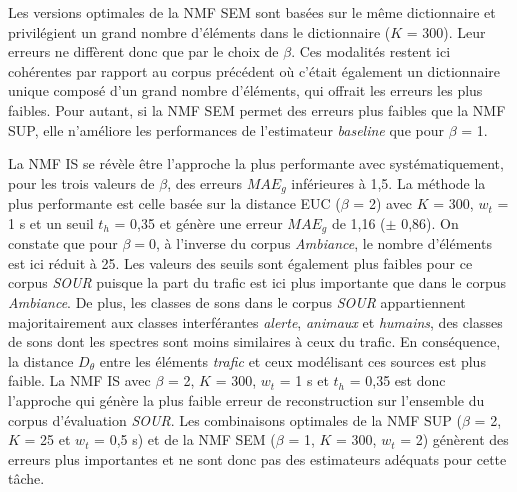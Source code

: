 Les versions optimales de la NMF SEM sont basées sur le même dictionnaire et privilégient un grand nombre d'éléments dans le dictionnaire ($K$ = 300). Leur erreurs ne diffèrent donc que par le choix de $\beta$. Ces modalités restent ici cohérentes par rapport au corpus précédent où c'était également un dictionnaire unique composé d'un grand nombre d'éléments, qui offrait les erreurs les plus faibles. Pour autant, si la NMF SEM permet des erreurs plus faibles que la NMF SUP, elle n'améliore les performances de l'estimateur \textit{baseline} que pour $\beta$ = 1.  

La NMF IS se révèle être l'approche la plus performante avec systématiquement, pour les trois valeurs de $\beta$, des erreurs $MAE_g$ inférieures à 1,5. La méthode la plus performante est celle basée sur la distance EUC ($\beta$ = 2) avec $K$ = 300, $w_t$ = 1 s et un seuil $t_h$ = 0,35 et génère une erreur $MAE_g$ de 1,16 ($\pm$ 0,86). On constate que pour $\beta = 0$, à l'inverse du corpus \textit{Ambiance}, le nombre d'éléments est ici réduit à 25. 
Les valeurs des seuils sont également plus faibles pour ce corpus \textit{SOUR} puisque la part du trafic est ici plus importante que dans le corpus \textit{Ambiance}. De plus, les classes de sons dans le corpus \textit{SOUR} appartiennent majoritairement aux classes interférantes \textit{alerte}, \textit{animaux} et \textit{humains}, des classes de sons dont les spectres sont moins similaires à ceux du trafic. En conséquence, la distance $D_{\theta}$ entre les éléments \textit{trafic} et ceux modélisant ces sources est plus faible. 
La NMF IS avec $\beta$ = 2, $K$ = 300, $w_t$ = 1 s et $t_h$ = 0,35 est donc l'approche qui génère la plus faible erreur de reconstruction sur l'ensemble du corpus d'évaluation \textit{SOUR}. Les combinaisons optimales de la NMF SUP ($\beta$ = 2, $K$ = 25 et $w_t$ = 0,5 s) et de la NMF SEM ($\beta$ = 1, $K$ = 300, $w_t$ = 2) génèrent des erreurs plus importantes et ne sont donc pas des estimateurs adéquats pour cette tâche.

